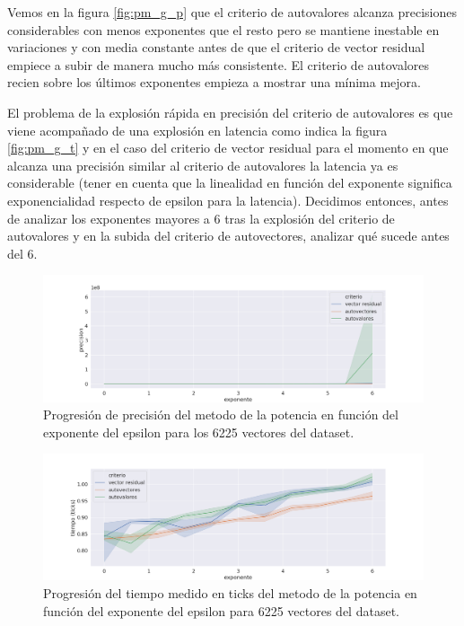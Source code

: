 Vemos en la figura \ref{fig:pm_g_p} que el criterio de autovalores alcanza precisiones considerables con menos exponentes que el resto pero se mantiene inestable en variaciones y con media constante antes de que el criterio de vector residual empiece a subir de manera mucho más consistente. El criterio de autovalores recien sobre los últimos exponentes empieza a mostrar una mínima mejora.

El problema de la explosión rápida en precisión del criterio de autovalores es que viene acompañado de una explosión en latencia como indica la figura \ref{fig:pm_g_t} y en el caso del criterio de vector residual para el momento en que alcanza una precisión similar al criterio de autovalores la latencia ya es considerable (tener en cuenta que la linealidad en función del exponente significa exponencialidad respecto de epsilon para la latencia). Decidimos entonces, antes de analizar los exponentes mayores a $6$ tras la explosión del criterio de autovalores y en la subida del criterio de autovectores, analizar qué sucede antes del $6$.

\begin{figure}[h]
\includegraphics[width=\textwidth]{./img/precision_corto_full.png}
\centering
\caption{Progresión de precisión del metodo de la potencia en función del exponente del epsilon para los 6225 vectores del dataset. \label{fig:pm_c_p}}
\end{figure}

\begin{figure}[h]
\includegraphics[width=\textwidth]{./img/tiempo_corto_full.png}
\centering
\caption{Progresión del tiempo medido en ticks del metodo de la potencia en función del exponente del epsilon para 6225 vectores del dataset. \label{fig:pm_c_t}}
\end{figure}


